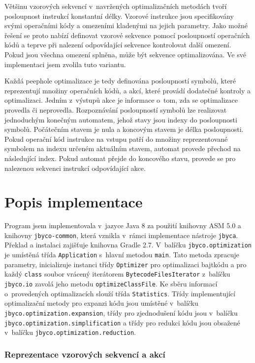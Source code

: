 Většinu vzorových sekvencí v~navržených optimalizačních metodách tvoří posloupnost instrukcí konstantní délky. Vzorové instrukce jsou specifikovány svými operačními kódy a omezeními kladenými na jejich parametry. Jako možné řešení se proto nabízí definovat vzorové sekvence pomocí posloupností operačních kódů a teprve při nalezení odpovídající sekvence kontrolovat další omezení. Pokud jsou všechna omezení splněna, může být sekvence optimalizována. Ve své implementaci jsem zvolila tuto variantu. 

Každá peephole optimalizace je tedy definována posloupností symbolů, které reprezentují množiny operačních kódů, a akcí, které provádí dodatečné kontroly a optimalizaci. Jedním z~výstupů akce je informace o~tom, zda se optimalizace provedla či neprovedla.
Rozpoznávání posloupností symbolů lze realizovat jednoduchým konečným automatem, jehož stavy jsou indexy do posloupnosti symbolů. Počátečním stavem je nula a koncovým stavem je délka posloupnosti. Pokud operační kód instrukce na vstupu patří do množiny reprezentované symbolem na indexu určeném aktuálním stavem, automat provede přechod na následující index. Pokud automat přejde do koncového stavu, provede se pro nalezenou sekvenci instrukcí odpovídající akce.

\section{Popis implementace}

Program jsem implementovala v~jazyce Java 8 za použití knihovny ASM 5.0 a knihovny \texttt{jbyco-common}, která vznikla v~rámci implementace nástroje \texttt{jbyca}. Překlad a instalaci zajišťuje knihovna Gradle 2.7. V~balíčku \texttt{jbyco.optimization} je umístěná třída \texttt{Application} s~hlavní metodou \texttt{main}. Tato metoda zpracuje parametry, inicializuje instanci třídy \texttt{Optimizer} pro optimalizaci bajtkódu a pro každý \texttt{class} soubor vrácený iterátorem \texttt{BytecodeFilesIterator} z~balíčku \texttt{jbyco.io} zavolá jeho metodu \texttt{optimizeClassFile}. Ke sběru informací o~provedených optimalizacích slouží třída \texttt{Statistics}. Třídy implementující optimalizační metody pro expanzi kódu jsou umístěné v~balíčku \texttt{jbyco.optimization.expansion}, třídy pro zjednodušení kódu jsou v~balíčku \texttt{jbyco.optimization.simplification} a třídy pro redukci kódu jsou obsažené v~balíčku \texttt{jbyco.optimization.reduction}.

\subsubsection{Reprezentace vzorových sekvencí a akcí}

